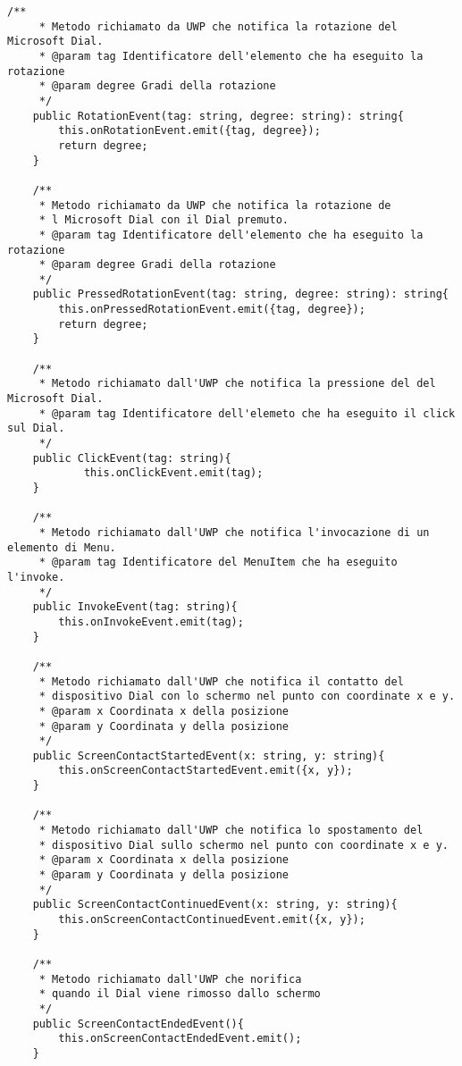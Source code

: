 \newpage
\vspace{1.0cm}
\begin{lstlisting}[caption={Metodi esposti da DialFrontendBridge},style=javaScriptCode]
   /**
     * Metodo richiamato da UWP che notifica la rotazione del Microsoft Dial.
     * @param tag Identificatore dell'elemento che ha eseguito la rotazione
     * @param degree Gradi della rotazione
     */
    public RotationEvent(tag: string, degree: string): string{
        this.onRotationEvent.emit({tag, degree});
        return degree;
    }

    /**
     * Metodo richiamato da UWP che notifica la rotazione de
     * l Microsoft Dial con il Dial premuto.
     * @param tag Identificatore dell'elemento che ha eseguito la rotazione
     * @param degree Gradi della rotazione
     */
    public PressedRotationEvent(tag: string, degree: string): string{
        this.onPressedRotationEvent.emit({tag, degree});
        return degree;
    }

    /**
     * Metodo richiamato dall'UWP che notifica la pressione del del Microsoft Dial.
     * @param tag Identificatore dell'elemeto che ha eseguito il click sul Dial.
     */
    public ClickEvent(tag: string){
            this.onClickEvent.emit(tag);
    }

    /**
     * Metodo richiamato dall'UWP che notifica l'invocazione di un elemento di Menu.
     * @param tag Identificatore del MenuItem che ha eseguito l'invoke.
     */
    public InvokeEvent(tag: string){
        this.onInvokeEvent.emit(tag);
    }

    /**
     * Metodo richiamato dall'UWP che notifica il contatto del 
     * dispositivo Dial con lo schermo nel punto con coordinate x e y.
     * @param x Coordinata x della posizione
     * @param y Coordinata y della posizione
     */
    public ScreenContactStartedEvent(x: string, y: string){
        this.onScreenContactStartedEvent.emit({x, y});
    }

    /**
     * Metodo richiamato dall'UWP che notifica lo spostamento del 
     * dispositivo Dial sullo schermo nel punto con coordinate x e y.
     * @param x Coordinata x della posizione
     * @param y Coordinata y della posizione
     */
    public ScreenContactContinuedEvent(x: string, y: string){
        this.onScreenContactContinuedEvent.emit({x, y});
    }

    /**
     * Metodo richiamato dall'UWP che norifica 
     * quando il Dial viene rimosso dallo schermo
     */
    public ScreenContactEndedEvent(){
        this.onScreenContactEndedEvent.emit();
    }
\end{lstlisting} 
\vspace{1.0cm}

